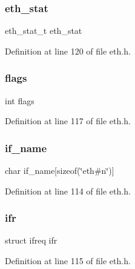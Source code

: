 \subsubsection{\texorpdfstring{eth\+\_\+stat}{eth\_stat}}
{\footnotesize\ttfamily eth\+\_\+stat\+\_\+t eth\+\_\+stat}



Definition at line 120 of file eth.\+h.

\hypertarget{structeth__card_ac8bf36fe0577cba66bccda3a6f7e80a4}{}\label{structeth__card_ac8bf36fe0577cba66bccda3a6f7e80a4} 
\subsubsection{\texorpdfstring{flags}{flags}}
{\footnotesize\ttfamily int flags}



Definition at line 117 of file eth.\+h.

\hypertarget{structeth__card_ad615009a0f37efe148e0d0f20487670b}{}\label{structeth__card_ad615009a0f37efe148e0d0f20487670b} 
\subsubsection{\texorpdfstring{if\+\_\+name}{if\_name}}
{\footnotesize\ttfamily char if\+\_\+name\mbox{[}sizeof(\char`\"{}eth\#n\char`\"{})\mbox{]}}



Definition at line 114 of file eth.\+h.

\hypertarget{structeth__card_ad51b4ffb80743dbef0392dfaf3814bf4}{}\label{structeth__card_ad51b4ffb80743dbef0392dfaf3814bf4} 
\subsubsection{\texorpdfstring{ifr}{ifr}}
{\footnotesize\ttfamily struct ifreq ifr}



Definition at line 115 of file eth.\+h.

\hypertarget{structeth__card_a7952778279f16f37cc6ecfd2c812ae5d}{}\label{structeth__card_a7952778279f16f37cc6ecfd2c812ae5d} 
